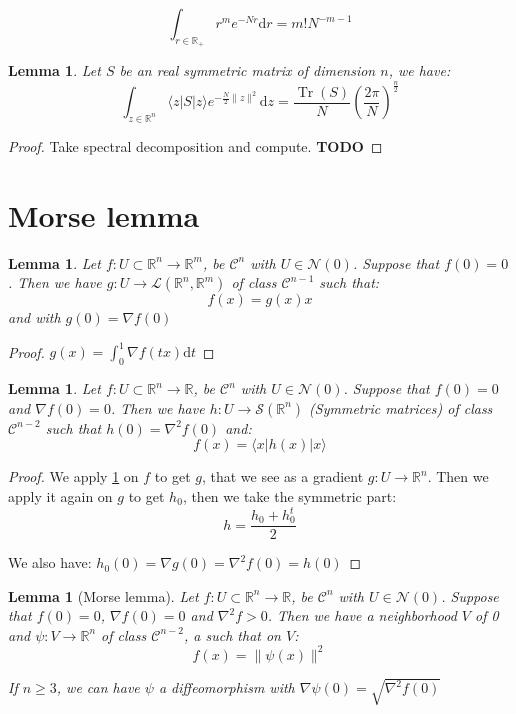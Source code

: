 \documentclass[10pt]{report}
\theoremstyle{plain}
\newtheorem{lem}[thm]{Lemma}
\theoremstyle{definition}
\theoremstyle{remark}
\newcommand{\R}{\ensuremath{\mathbb{R}}}
\newcommand{\TODO}{\textbf{TODO}}
\newcommand{\ket}[1]{|#1\rangle}
\newcommand{\bra}[1]{\langle#1|}
\newcommand{\dd}{\mathrm{d}}
\renewcommand{\geq}{\geqslant}
\DeclareMathOperator{\Tr}{Tr}
\newcommand{\class}[1]{{\mathscr{C}^{#1}}}
\begin{document}
\begin{equation}\label{eqn:gamma}
  \int_{r \in\R_+} r^{m} e^{- N r} \dd r = m! N^{-m-1}
\end{equation}



\begin{lem}\label{lem:gausssymtr}
  Let $S$ be an real symmetric matrix of dimension $n$, we have:
  \[\int_{z \in \R^n} \bra z S \ket z e^{-\frac N 2 \|z\|^2} \dd z =
    \frac{\Tr(S)}N {\left(\frac
        {2\pi}{N}\right)}^{\frac n 2} \]
\end{lem}
\begin{proof} Take spectral decomposition and compute.
  \TODO{}
\end{proof}

\section{Morse lemma}

\begin{lem}\label{lem:dec}
  Let $f : U \subset \R^n \to \R^m$, be $\class{n}$ with $U \in \mathcal{N}(0)$.
  Suppose that $f(0) = 0$. Then we have $g : U \to \mathcal{L}(\R^n,\R^m)$ of
  class $\class {n-1}$ such
  that:
  \[f(x) = g(x) x\]
  and with $g(0) = \nabla f(0)$
\end{lem}

\begin{proof}
  $g(x) = \int_0^1 \nabla f(tx) \dd t$
\end{proof}

\begin{lem}\label{lem:dec2}
  Let $f : U \subset \R^n \to \R$, be $\class{n}$ with $U \in \mathcal{N}(0)$.
  Suppose that $f(0) = 0$ and $\nabla f(0) = 0$.
  Then we have $h : U \to \mathcal{S}(\R^n)$ (Symmetric matrices) of class
  $\class {n-2}$ such
  that $h(0) = \nabla^2 f(0)$ and:
  \[f(x) = \bra x h(x) \ket x\]
\end{lem}

\begin{proof}
  We apply \cref{lem:dec} on $f$ to get $g$, that we see as a gradient $g :U \to
  \R^n$. Then we apply it again on $g$ to get $h_0$, then we take the symmetric part:
  \[h = \frac{h_0 + h_0^t}2\]

  We also have: $h_0(0) = \nabla g(0) = \nabla^2 f(0) = h(0)$
\end{proof}


\begin{lem}[Morse lemma]\label{lem:morse}
  Let $f : U \subset \R^n \to \R$, be $\class{n}$ with $U \in \mathcal{N}(0)$.
  Suppose that $f(0) = 0$, $\nabla f(0) = 0$ and $\nabla^2 f > 0$.
  Then we have a neighborhood $V$ of 0 and $\psi : V \to \R^n$ of class
  $\class{n-2}$, a such that on $V$:
  \[f(x) = \|\psi(x)\|^2\]

  If $n \geq 3$, we can have $\psi$ a diffeomorphism with $\nabla \psi(0) = \sqrt{\nabla^2 f(0)}$
\end{lem}
\end{document}
